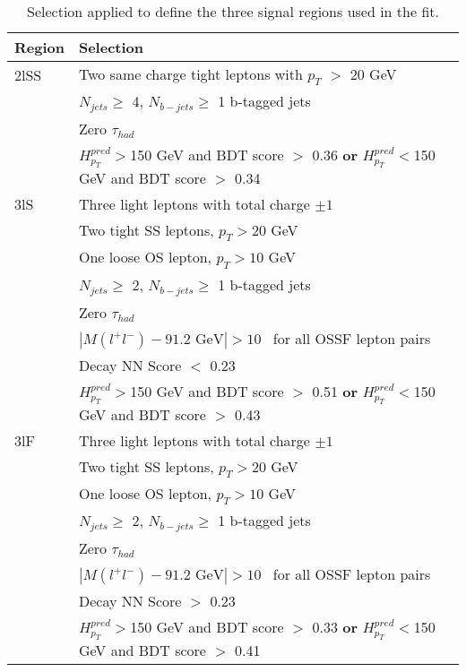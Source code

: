 \begin{table}[H]
  \begin{center}
  \begin{tabular}{ll}
  \hline\hline
  Region & Selection \\
  \hline
  2lSS & Two same charge tight leptons with $p_T$ $>$ 20 GeV \\
  & $N_{jets}\geq$ 4, $N_{b-jets}\geq$ 1 b-tagged jets \\
  & Zero $\tau_{had}$\\
  & $H^{pred}_{p_T}>$150 GeV and BDT score $>$ 0.36 \textbf{or} $H^{pred}_{p_T}<$150 GeV and BDT score $>$ 0.34 \\
  \hline
  3lS & Three light leptons with total charge $\pm 1$ \\
  & Two tight SS leptons, $p_T > 20$ GeV \\
  & One loose OS lepton, $p_T > 10$ GeV \\
  & $N_{jets}\geq$ 2, $N_{b-jets}\geq$ 1 b-tagged jets \\
  & Zero $\tau_{had}$ \\           
  & $|M(l^+l^-)-91.2\textrm{ GeV}| > 10$~\GeV{} for all OSSF lepton pairs \\
  & Decay NN Score $<$ 0.23 \\
  & $H^{pred}_{p_T}>$150 GeV and BDT score $>$ 0.51 \textbf{or} $H^{pred}_{p_T}<$150 GeV and BDT score $>$ 0.43 \\
  \hline
  3lF & Three light leptons with total charge $\pm 1$ \\
  & Two tight SS leptons, $p_T > 20$ GeV \\                                                                                  
  & One loose OS lepton, $p_T > 10$ GeV \\                                                                                   
  & $N_{jets}\geq$ 2, $N_{b-jets}\geq$ 1 b-tagged jets \\
  & Zero $\tau_{had}$ \\
  & $|M(l^+l^-)-91.2\textrm{ GeV}| > 10$~\GeV{} for all OSSF lepton pairs \\                                                 
  & Decay NN Score $>$ 0.23 \\
  & $H^{pred}_{p_T}>$150 GeV and BDT score $>$ 0.33 \textbf{or} $H^{pred}_{p_T}<$150 GeV and BDT score $>$ 0.41 \\
  \hline\hline
  \end{tabular}
  \end{center}
  \caption{Selection applied to define the three signal regions used in the fit.}
  \label{tab:sigRegionCuts}
\end{table}

